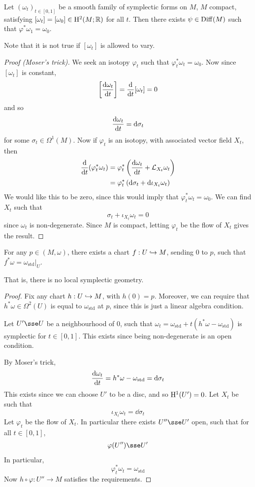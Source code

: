 \documentclass{article}
\begin{document}
\lec

\begin{theorem}
    [Moser] Let \((\omega_t)_{t \in [0, 1]}\) be a smooth family of symplectic forms on \(M\), \(M\) compact, satisfying \([\omega_t] = [\omega_0] \in \mathrm{H}^2(M; \mathbb{R})\) for all \(t\). Then there exists \(\psi \in \operatorname{Diff}(M)\) such that \(\varphi^*\omega_1 = \omega_0\).
\end{theorem}

Note that it is not true if \([\omega_t]\) is allowed to vary.

\begin{proof}
    [Proof (Moser's trick)] We seek an isotopy \(\varphi_t\) such that \(\varphi_t^*\omega_t = \omega_0\). Now since \([\omega_t]\) is constant,
    \[\left[\dv{\omega_t}{t}\right] = \dv{t}[\omega_t] = 0\]
    and so
    \[\dv{\omega_t}{t} = \dd\sigma_t\]
    for some \(\sigma_t \in \Omega^1(M)\). Now if \(\varphi_t\) is an isotopy, with associated vector field \(X_t\), then
    \begin{align*}
        \dv{t}(\varphi_t^*\omega_t) &= \varphi_t^*\left(\dv{\omega_t}{t} + \mathcal{L}_{X_t}\omega_t\right) \\
        &= \varphi_t^*\left(\dd\sigma_t + \dd \iota_{X_t}\omega_t\right)
    \end{align*}
    We would like this to be zero, since this would imply that \(\varphi_t^*\omega_t = \omega_0\). We can find \(X_t\) such that
    \[\sigma_t + \iota_{X_t}\omega_t = 0\]
    since \(\omega_t\) is non-degenerate. Since \(M\) is compact, letting \(\varphi_t\) be the flow of \(X_t\) gives the result.
\end{proof}

\begin{theorem}
     For any \(p \in (M, \omega)\), there exists a chart \(f : U \hookrightarrow M\), sending \(0\) to \(p\), such that \(f^*\omega = \omega_{\text{std}}\vert_U\).
\end{theorem}

That is, there is no local symplectic geometry.

\begin{proof}
    Fix any chart \(h : U \hookrightarrow M\), with \(h(0) = p\). Moreover, we can require that \(h^*\omega \in \Omega^2(U)\) is equal to \(\omega_{\text{std}}\) at \(p\), since this is just a linear algebra condition.

    Let \(U' \sse U\) be a neighbourhood of \(0\), such that \(\omega_t = \omega_{\mathrm{std}} + t(h^*\omega - \omega_{\mathrm{std}})\) is symplectic for \(t \in [0, 1]\). This exists since being non-degenerate is an open condition.

    By Moser's trick,
    \[\dv{\omega_t}{t} = h^*\omega - \omega_{\mathrm{std}} = \dd \sigma_t\]
    This exists since we can choose \(U'\) to be a disc, and so \(\mathrm{H}^1(U') = 0\). Let \(X_t\) be such that
    \[\iota_{X_t}\omega_t = \dd \sigma_t\]
    Let \(\varphi_t\) be the flow of \(X_t\). In particular there exists \(U'' \sse U'\) open, such that for all \(t \in [0, 1]\),
    \[\varphi(U'') \sse U'\]
    In particular,
    \[\varphi_t^*\omega_t = \omega_{\text{std}}\]
    Now \(h \circ \varphi : U'' \to M\) satisfies the requirements.
\end{proof}
\end{document}
